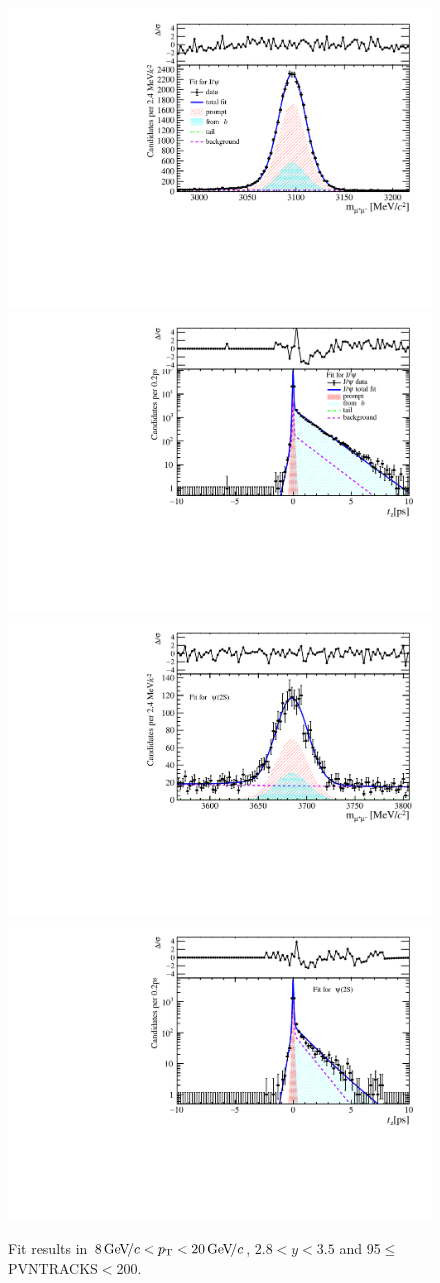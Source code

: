 \begin{figure}[H]
\begin{center}
\includegraphics[width=0.47\linewidth]{pdf/Jpsi/drawmass/n5y2pt5.pdf}
\includegraphics[width=0.47\linewidth]{pdf/Jpsi/2DFit/n5y2pt5.pdf}
\vspace*{-0.5cm}
\includegraphics[width=0.47\linewidth]{pdf/Psi2S/drawmass/n5y2pt5.pdf}
\includegraphics[width=0.47\linewidth]{pdf/Psi2S/2DFit/n5y2pt5.pdf}
\vspace*{-0.5cm}
\end{center}
\caption{Fit results in $8\text{\,Ge\kern -0.1em V\!/}c<p_{\mathrm{T}}<20\text{\,Ge\kern -0.1em V\!/}c$, $2.8<y<3.5$ and 95$\leq$PVNTRACKS$<$200.}
\label{Fitn5y2pt5}
\end{figure}
